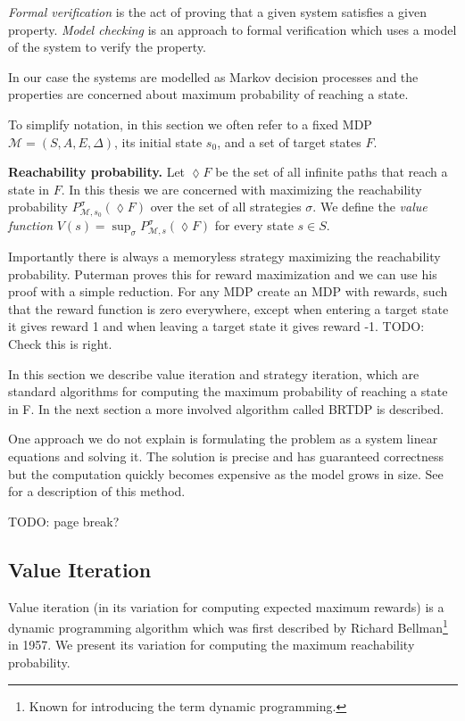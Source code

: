 {\em Formal verification} is the act of proving that a given system satisfies
a given property. {\em Model
checking} is an approach to formal verification which uses a model of
the system to verify the property.

In our case the systems are modelled as Markov decision processes and
the properties are concerned about maximum probability of reaching a state.

To simplify notation, in this section we often refer to a fixed MDP $\mathcal{M} =
(S,A,E,\Delta)$, its initial state $s_0$, and a set of target states $F$.

\noindent \textbf{Reachability probability.}
Let $\lozenge F$ be the set of all infinite paths that reach a state in $F$.
In this thesis we are concerned with maximizing the reachability
probability $P^\sigma_{\mathcal{M},s_0}(\lozenge F)$ over the set of all
strategies $\sigma$.
We define the {\em value function} $V(s) = \sup_{\sigma}
P^\sigma_{\mathcal{M},s}(\lozenge F)$ for every state $s \in S$.

Importantly there is always a memoryless strategy maximizing the
reachability probability. Puterman \parencite{puterman} proves this for
reward maximization and we can use his proof with a simple reduction.
For any MDP create an MDP with rewards, such that the reward function
is zero everywhere, except when entering a target state it gives reward 1
and when leaving a target state it gives reward -1. TODO: Check this is
right.

In this section we describe value iteration and strategy iteration,
which are standard algorithms for computing the maximum probability of
reaching a state in F. In the next section a more involved algorithm
called BRTDP is described.

One approach we do not explain is formulating the problem as a system
linear equations and solving it. The solution is precise and has
guaranteed correctness but the computation quickly becomes expensive as
the model grows in size.  See \parencite{forejt} for a description of
this method.

TODO: page break?

\subsection{Value Iteration}

Value iteration (in its variation for computing expected maximum rewards) is a
dynamic programming algorithm which was first described by Richard
Bellman\footnote{Known for introducing the term dynamic programming.}
\parencite{bellman} in 1957. We present its variation for computing the maximum
reachability probability.

